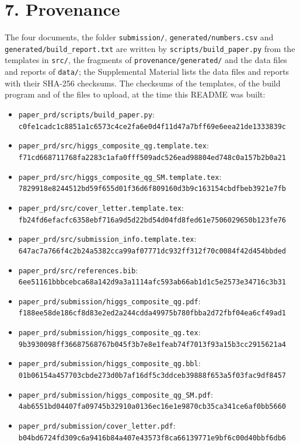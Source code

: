 \documentclass[
  10pt,
]{article}
\providecommand{\tightlist}{%
  \setlength{\itemsep}{0pt}\setlength{\parskip}{0pt}}
\begin{document}
\hypertarget{provenance}{%
\section{7. Provenance}\label{provenance}}

The four documents, the folder \texttt{submission/},
\texttt{generated/numbers.csv} and \texttt{generated/build\_report.txt}
are written by \texttt{scripts/build\_paper.py} from the templates in
\texttt{src/}, the fragments of \texttt{provenance/generated/} and the
data files and reports of \texttt{data/}; the Supplemental Material
lists the data files and reports with their SHA-256 checksums. The
checksums of the templates, of the build program and of the files to
upload, at the time this README was built:

\begin{itemize}
\tightlist
\item
  \texttt{paper\_prd/scripts/build\_paper.py}:\\
  \texttt{c0fe1cadc1c8851a1c6573c4ce2fa6e0d4f11d47a7bff69e6eea21de1333839c}
\item
  \texttt{paper\_prd/src/higgs\_composite\_qg.template.tex}:\\
  \texttt{f71cd668711768fa2283c1afa0fff509adc526ead98804ed748c0a157b2b0a21}
\item
  \texttt{paper\_prd/src/higgs\_composite\_qg\_SM.template.tex}:\\
  \texttt{7829918e8244512bd59f655d01f36d6f809160d3b9c163154cbdfbeb3921e7fb}
\item
  \texttt{paper\_prd/src/cover\_letter.template.tex}:\\
  \texttt{fb24fd6efacfc6358ebf716a9d5d22bd54d04fd8fed61e7506029650b123fe76}
\item
  \texttt{paper\_prd/src/submission\_info.template.tex}:\\
  \texttt{647ac7a766f4c2b24a5382cca99af07771dc932ff312f70c0084f42d454bbded}
\item
  \texttt{paper\_prd/src/references.bib}:\\
  \texttt{6ee51161bbbcebca68a142d9a3a1114afc593ab66ab1d1c5e2573e34716c3b31}
\item
  \texttt{paper\_prd/submission/higgs\_composite\_qg.pdf}:\\
  \texttt{f188ee58de186cf8d83e2ed2a244cdda49975b780fbba2d72fbf04ea6cf49ad1}
\item
  \texttt{paper\_prd/submission/higgs\_composite\_qg.tex}:\\
  \texttt{9b3930098ff36687568767b045f3b7e8e1feab74f7013f93a15b3cc2915621a4}
\item
  \texttt{paper\_prd/submission/higgs\_composite\_qg.bbl}:\\
  \texttt{01b06154a457703cbde273d0b7af16df5c3ddceb39888f653a5f03fac9df8457}
\item
  \texttt{paper\_prd/submission/higgs\_composite\_qg\_SM.pdf}:\\
  \texttt{4ab6551bd04407fa09745b32910a0136ec16e1e9870cb35ca341ce6af0bb5660}
\item
  \texttt{paper\_prd/submission/cover\_letter.pdf}:\\
  \texttt{b04bd6724fd309c6a9416b84a407e43573f8ca66139771e9bf6c00d40bbf6db6}
\end{itemize}
\end{document}

